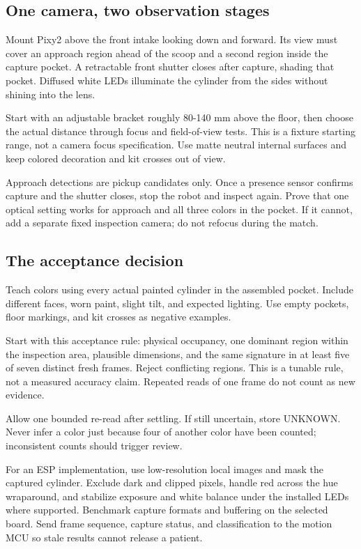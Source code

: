 \documentclass[10pt,a4paper]{article}
\begin{document}
\subsection{One camera, two observation stages}
Mount Pixy2 above the front intake looking down and forward. Its view must cover an approach region ahead of the scoop and a second region inside the capture pocket. A retractable front shutter closes after capture, shading that pocket. Diffused white LEDs illuminate the cylinder from the sides without shining into the lens.

Start with an adjustable bracket roughly 80-140 mm above the floor, then choose the actual distance through focus and field-of-view tests. This is a fixture starting range, not a camera focus specification. Use matte neutral internal surfaces and keep colored decoration and kit crosses out of view.

Approach detections are pickup candidates only. Once a presence sensor confirms capture and the shutter closes, stop the robot and inspect again. Prove that one optical setting works for approach and all three colors in the pocket. If it cannot, add a separate fixed inspection camera; do not refocus during the match.

\subsection{The acceptance decision}
Teach colors using every actual painted cylinder in the assembled pocket. Include different faces, worn paint, slight tilt, and expected lighting. Use empty pockets, floor markings, and kit crosses as negative examples.

Start with this acceptance rule: physical occupancy, one dominant region within the inspection area, plausible dimensions, and the same signature in at least five of seven distinct fresh frames. Reject conflicting regions. This is a tunable rule, not a measured accuracy claim. Repeated reads of one frame do not count as new evidence.

Allow one bounded re-read after settling. If still uncertain, store UNKNOWN. Never infer a color just because four of another color have been counted; inconsistent counts should trigger review.

For an ESP implementation, use low-resolution local images and mask the captured cylinder. Exclude dark and clipped pixels, handle red across the hue wraparound, and stabilize exposure and white balance under the installed LEDs where supported. Benchmark capture formats and buffering on the selected board. Send frame sequence, capture status, and classification to the motion MCU so stale results cannot release a patient.
\end{document}
